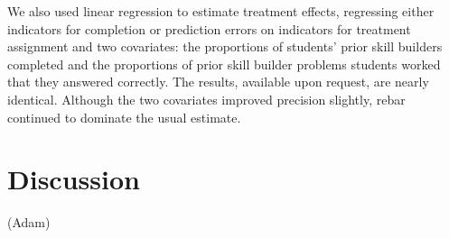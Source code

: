 \documentclass{edm_template}
\newcommand{\model}{\hat{y}_0(\cdot)}
\begin{document}
We also used linear regression to estimate treatment effects, regressing either indicators for completion or prediction errors on indicators for treatment assignment and two covariates: the proportions of students' prior skill builders completed and the proportions of prior skill builder problems students worked that they answered correctly. 
The results, available upon request, are nearly identical.
Although the two covariates improved precision slightly, rebar continued to dominate the usual estimate. 

\section{Discussion}
(Adam)


  
\end{document}
